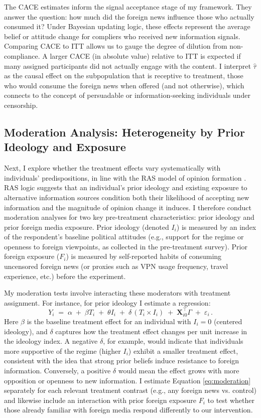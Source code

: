 \documentclass[12pt, american]{article}
\begin{document}
The CACE estimates inform the signal acceptance stage of my framework. They answer the question: how much did the foreign news influence those who actually consumed it? Under Bayesian updating logic, these effects represent the average belief or attitude change for compliers who received new information signals. Comparing CACE to ITT allows us to gauge the degree of dilution from non-compliance. A larger CACE (in absolute value) relative to ITT is expected if many assigned participants did not actually engage with the content. I interpret $\hat{\tau}$ as the causal effect on the subpopulation that is receptive to treatment, those who would consume the foreign news when offered (and not otherwise), which connects to the concept of persuadable or information-seeking individuals under censorship.

\subsection{Moderation Analysis: Heterogeneity by Prior Ideology and Exposure}
Next, I explore whether the treatment effects vary systematically with individuals’ predispositions, in line with the RAS model of opinion formation \citep{zaller1992nature}. RAS logic suggests that an individual's prior ideology and existing exposure to alternative information sources condition both their likelihood of accepting new information and the magnitude of opinion change it induces. I therefore conduct moderation analyses for two key pre-treatment characteristics: prior ideology and prior foreign media exposure. Prior ideology (denoted $I_i$) is measured by an index of the respondent’s baseline political attitudes (e.g., support for the regime or openness to foreign viewpoints, as collected in the pre-treatment survey). Prior foreign exposure ($F_i$) is measured by self-reported habits of consuming uncensored foreign news (or proxies such as VPN usage frequency, travel experience, etc.) before the experiment. 

My moderation tests involve interacting these moderators with treatment assignment. For instance, for prior ideology I estimate a regression:
\begin{equation}\label{eq:moderation}
Y_{i} \;=\; \alpha \;+\; \beta T_{i} \;+\; \theta I_{i} \;+\; \delta\,(T_{i} \times I_{i}) \;+\; \mathbf{X}_{i0}^{\top}\Gamma \;+\; \varepsilon_{i}\,. 
\end{equation}
Here $\beta$ is the baseline treatment effect for an individual with $I_i=0$ (centered ideology), and $\delta$ captures how the treatment effect changes per unit increase in the ideology index. A negative $\delta$, for example, would indicate that individuals more supportive of the regime (higher $I_i$) exhibit a smaller treatment effect, consistent with the idea that strong prior beliefs induce resistance to foreign information. Conversely, a positive $\delta$ would mean the effect grows with more opposition or openness to new information. I estimate Equation \eqref{eq:moderation} separately for each relevant treatment contrast (e.g., any foreign news vs. control) and likewise include an interaction with prior foreign exposure $F_i$ to test whether those already familiar with foreign media respond differently to our intervention.
\end{document}
